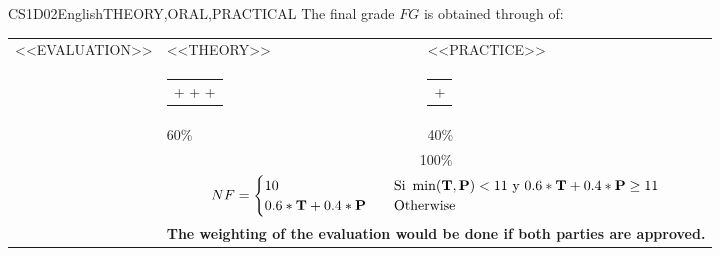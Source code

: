   \begin{evaluation}{CS1D02}{English}{THEORY,ORAL,PRACTICAL}
  The final grade $FG$ is obtained through of:

  \begin{tabularx}{0.9\textwidth}{|X|p{}|p{}|} \hline
    \multirow{4}{*}{\uppercase{<<Evaluation>>}} & \uppercase{<<Theory>>} & \uppercase{<<Practice>>} \\ \cline{2-3}
    & %
    \begin{minipage}{0.95\textwidth}
      \begin{tabular}{l}
        $\text{\textbf{T}} = [<<ExamAcronym>>_{1}$  +
        $<<ExamAcronym>>_{2}$  +
        $<<ExamAcronym>>_{3}$  +
        $<<ExamAcronym>>_{4}]/4$
      \end{tabular}
    \end{minipage}
    & %
      \begin{minipage}{0.95\textwidth}
      \begin{tabular}{l}
          $\text{\textbf{P}} = [<<ContinuousAssessmentAcronym>>_{1}$ +
          $<<ContinuousAssessmentAcronym>>_{2}]/2$
      \end{tabular}
    \end{minipage}                 \\ \cline{2-3}
    
    & %
    60\% 
    & %
    40\% \\ \cline{2-3}
    & \multicolumn{2}{c|}{100\%}  \\ \cline{2-3}
    & \multicolumn{2}{c|}{
      \begin{math}
        NF =
        \begin{cases}
          10     & \quad \text{Si } \min(\text{\textbf{T}},\text{\textbf{P}}) < 11 \text{ y } 0.6*\text{\textbf{T}} + 0.4*\text{\textbf{P}} \geq 11 \\
          0.6*\text{\textbf{T}} + 0.4*\text{\textbf{P}}  & \quad \text{Otherwise}
        \end{cases}
      \end{math}
    } \\ \cline{2-3}
    & \multicolumn{2}{c|}{\textbf{The weighting of the evaluation would be done if both parties are approved.}}  \\ \hline
    \end{tabularx}
      

\end{evaluation}
